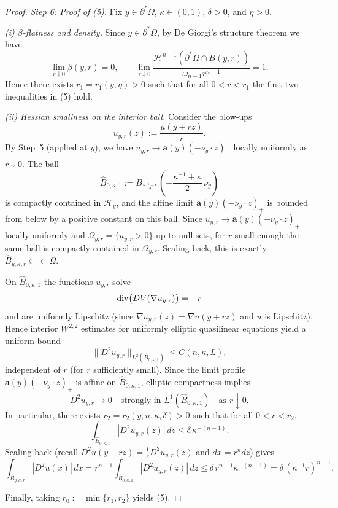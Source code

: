 \documentclass[reqno,11pt]{amsart}
\numberwithin{equation}{section}
\theoremstyle{remark}
\begin{document}
\begin{proof}
\medskip
\noindent\textit{Step 6: Proof of (5).}
Fix $y\in\partial^*\Omega$, $\kappa\in(0,1)$, $\delta>0$, and $\eta>0$.

\smallskip
\noindent\emph{(i) $\beta$-flatness and density.}
Since $y\in\partial^*\Omega$, by De Giorgi's structure theorem \cite[Theorem~15.9]{M2012} we have
\[
\lim_{r\downarrow 0}\beta(y,r)=0,
\qquad
\lim_{r\downarrow 0}\frac{\mathscr H^{n-1}(\partial^*\Omega\cap B(y,r))}{\omega_{n-1}r^{n-1}}=1.
\]
Hence there exists $r_1=r_1(y,\eta)>0$ such that for all $0<r<r_1$ the first two inequalities in (5) hold.

\smallskip
\noindent\emph{(ii) Hessian smallness on the interior ball.}
Consider the blow-ups
\[
u_{y,r}(z):=\frac{u(y+r z)}{r}.
\]
By Step~5 (applied at $y$), we have $u_{y,r}\to \mathbf a(y)(-\nu_y\cdot z)_+$ locally uniformly as $r\downarrow 0$.
{The ball}
\[
\hat B_{0,\kappa,1}:=
B_{\frac{\kappa^{-1}-\kappa}{2}}\!\left(-\frac{\kappa^{-1}+\kappa}{2}\,\nu_y\right)
\]
{is compactly contained in $\mathcal H_y$, and the affine limit
$\mathbf a(y)(-\nu_y\cdot z)_+$ is bounded from below by a positive constant on this ball. Since
$u_{y,r}\to \mathbf a(y)(-\nu_y\cdot z)_+$ locally uniformly and
$\Omega_{y,r}=\{u_{y,r}>0\}$ up to null sets, for $r$ small enough the same ball is compactly contained in
$\Omega_{y,r}$. Scaling back, this is exactly $\hat B_{y,\kappa,r}\subset\subset\Omega$.}

On $\hat B_{0,\kappa,1}$ the functions $u_{y,r}$ solve
\[
{\rm div}\bigl(DV(\nabla u_{y,r})\bigr)=-r
\]
and are uniformly Lipschitz (since $\nabla u_{y,r}(z)=\nabla u(y+r z)$ and $u$ is Lipschitz). Hence interior $W^{2,2}$
estimates for uniformly elliptic quasilinear equations yield a uniform bound
\[
\|D^2u_{y,r}\|_{L^2(\hat B_{0,\kappa,1})}\le C(n,\kappa,L),
\]
independent of $r$ (for $r$ sufficiently small). Since the limit profile $\mathbf a(y)(-\nu_y\cdot z)_+$ is affine on
$\hat B_{0,\kappa,1}$, elliptic compactness implies
\[
D^2u_{y,r}\to 0 \quad\text{strongly in }L^1(\hat B_{0,\kappa,1})\quad\text{as }r\downarrow 0.
\]
In particular, there exists $r_2=r_2(y,n,\kappa,\delta)>0$ such that for all $0<r<r_2$,
\[
\int_{\hat B_{0,\kappa,1}} |D^2u_{y,r}(z)|\,dz \le \delta\,\kappa^{-(n-1)}.
\]
Scaling back (recall $D^2u(y+r z)=\frac1r D^2u_{y,r}(z)$ and $dx=r^n dz$) gives
\[
\int_{\hat B_{y,\kappa,r}} |D^2u(x)|\,dx
= r^{n-1}\int_{\hat B_{0,\kappa,1}} |D^2u_{y,r}(z)|\,dz
\le \delta\, r^{n-1}\kappa^{-(n-1)} = \delta\,(\kappa^{-1}r)^{n-1}.
\]

\smallskip
Finally, taking $r_0:=\min\{r_1,r_2\}$ yields (5).
\end{proof}
\end{document}
